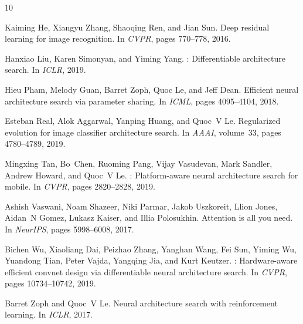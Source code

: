 \documentclass[12pt]{article}
\begin{document}
\begin{thebibliography}{10}

Kaiming He, Xiangyu Zhang, Shaoqing Ren, and Jian Sun.
\newblock Deep residual learning for image recognition.
\newblock In \textit{CVPR}, pages 770--778, 2016.

Hanxiao Liu, Karen Simonyan, and Yiming Yang.
: Differentiable architecture search.
\newblock In \textit{ICLR}, 2019.

Hieu Pham, Melody Guan, Barret Zoph, Quoc Le, and Jeff Dean.
\newblock Efficient neural architecture search via parameter sharing.
\newblock In \textit{ICML}, pages 4095--4104, 2018.

Esteban Real, Alok Aggarwal, Yanping Huang, and Quoc~V Le.
\newblock Regularized evolution for image classifier architecture search.
\newblock In \textit{AAAI}, volume~33, pages 4780--4789, 2019.

Mingxing Tan, Bo~Chen, Ruoming Pang, Vijay Vasudevan, Mark Sandler, Andrew Howard, and Quoc~V Le.
: Platform-aware neural architecture search for mobile.
\newblock In \textit{CVPR}, pages 2820--2828, 2019.

Ashish Vaswani, Noam Shazeer, Niki Parmar, Jakob Uszkoreit, Llion Jones, Aidan~N Gomez, Lukasz Kaiser, and Illia Polosukhin.
\newblock Attention is all you need.
\newblock In \textit{NeurIPS}, pages 5998--6008, 2017.

Bichen Wu, Xiaoliang Dai, Peizhao Zhang, Yanghan Wang, Fei Sun, Yiming Wu, Yuandong Tian, Peter Vajda, Yangqing Jia, and Kurt Keutzer.
: Hardware-aware efficient convnet design via differentiable neural architecture search.
\newblock In \textit{CVPR}, pages 10734--10742, 2019.

Barret Zoph and Quoc~V Le.
\newblock Neural architecture search with reinforcement learning.
\newblock In \textit{ICLR}, 2017.

\end{thebibliography}
\end{document}

